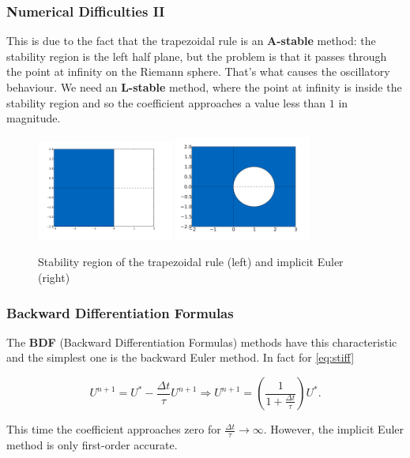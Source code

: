 \documentclass{beamer}
\renewcommand{\d}{\Delta}
\renewcommand{\emph}[1]{\textcolor{tum}{\textbf{#1}}}
\begin{document}
\begin{frame}
	\frametitle{Numerical Difficulties II}

	This is due to the fact that the trapezoidal rule is an \emph{A-stable} method: the stability region is the left half plane, but the problem is that it passes through the point at infinity on the Riemann sphere. That's what causes the oscillatory behaviour. We need an \emph{L-stable} method, where the point at infinity is inside the stability region and so the coefficient approaches a value less than $1$ in magnitude. 

	\begin{figure}[!ht]
		\centering
		\includegraphics[width=0.4\textwidth]{TrapezoidalStability.png}%
		\label{fig:TrapezoidalStability}
		\includegraphics[width=0.4\textwidth]{EulerStability.png}%
		\label{fig:EulerStability}

		\caption{Stability region of the trapezoidal rule (left) and implicit Euler  (right)}
		\label{fi:stability}
	\end{figure}
\end{frame}

\begin{frame}
	\frametitle{Backward Differentiation Formulas}

	The \emph{BDF} (Backward Differentiation Formulas) methods have this characteristic and the simplest one is the backward Euler method. In fact for \eqref{eq:stiff}

	\begin{equation}
		U^{n+1}=U^*-\frac{\d t}{\tau}U^{n+1}\Rightarrow U^{n+1} = \left(\frac{1}{1+\frac{\d t}{\tau}}\right)U^*.
	\end{equation}

	This time the coefficient approaches zero for $\frac{\d t }{\tau}\rightarrow\infty$. However, the implicit Euler method is only first-order accurate.
\end{frame}
\end{document}
